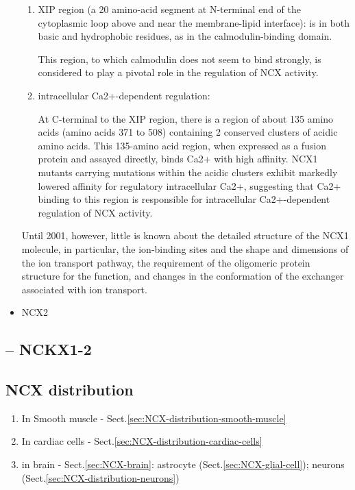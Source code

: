 \begin{itemize}
\begin{enumerate}
  \item XIP region (a 20 amino-acid segment at N-terminal end of the cytoplasmic
  loop above and near the membrane-lipid interface): is in both basic and
  hydrophobic residues, as in the calmodulin-binding domain.
  
This region, to which calmodulin does not seem to bind strongly, is considered
to play a pivotal role in the regulation of NCX activity.

  \item intracellular Ca2+-dependent regulation:
  
At C-terminal to the XIP region, there is a region of about 135 amino acids
(amino acids 371 to 508) containing 2 conserved clusters of acidic amino acids.
This 135-amino acid region, when expressed as a fusion protein and assayed
directly, binds Ca2+ with high affinity. NCX1 mutants carrying mutations
within the acidic clusters exhibit markedly lowered affinity for regulatory
intracellular Ca2+, suggesting that Ca2+ binding to this region is responsible
for intracellular Ca2+-dependent regulation of NCX activity.

\end{enumerate}
Until 2001, however, little is known about the detailed
structure of the NCX1 molecule, in particular, the ion-binding
sites and the shape and dimensions of the ion transport
pathway, the requirement of the oligomeric protein structure
for the function, and changes in the conformation of the
exchanger associated with ion transport.


  \item NCX2

\end{itemize}



\subsection{-- NCKX1-2}



\subsection{NCX distribution}
\label{sec:NCX-distribution}

\begin{enumerate}
  \item In Smooth muscle - Sect.\ref{sec:NCX-distribution-smooth-muscle}
  \item In cardiac cells - Sect.\ref{sec:NCX-distribution-cardiac-cells}
  \item in brain - Sect.\ref{sec:NCX-brain}:
  astrocyte (Sect.\ref{sec:NCX-glial-cell}); neurons (Sect.\ref{sec:NCX-distribution-neurons})
\end{enumerate}


